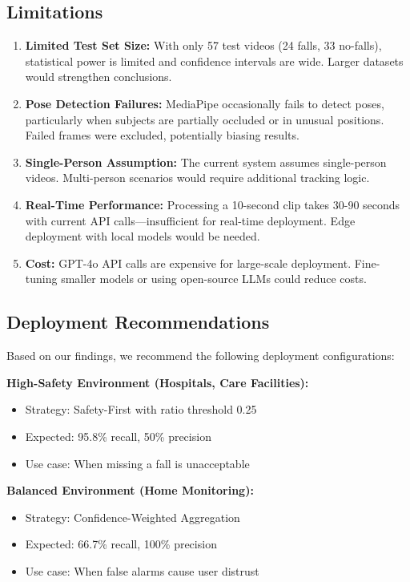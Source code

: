 \documentclass[conference]{IEEEtran}
\begin{document}
\subsection{Limitations}

\begin{enumerate}[leftmargin=*]
    \item \textbf{Limited Test Set Size:} With only 57 test videos (24 falls, 33 no-falls), statistical power is limited and confidence intervals are wide. Larger datasets would strengthen conclusions.
    
    \item \textbf{Pose Detection Failures:} MediaPipe occasionally fails to detect poses, particularly when subjects are partially occluded or in unusual positions. Failed frames were excluded, potentially biasing results.
    
    \item \textbf{Single-Person Assumption:} The current system assumes single-person videos. Multi-person scenarios would require additional tracking logic.
    
    \item \textbf{Real-Time Performance:} Processing a 10-second clip takes 30-90 seconds with current API calls—insufficient for real-time deployment. Edge deployment with local models would be needed.
    
    \item \textbf{Cost:} GPT-4o API calls are expensive for large-scale deployment. Fine-tuning smaller models or using open-source LLMs could reduce costs.
\end{enumerate}

\subsection{Deployment Recommendations}

Based on our findings, we recommend the following deployment configurations:

\textbf{High-Safety Environment (Hospitals, Care Facilities):}
\begin{itemize}[leftmargin=*]
    \item Strategy: Safety-First with ratio threshold 0.25
    \item Expected: 95.8\% recall, 50\% precision
    \item Use case: When missing a fall is unacceptable
\end{itemize}

\textbf{Balanced Environment (Home Monitoring):}
\begin{itemize}[leftmargin=*]
    \item Strategy: Confidence-Weighted Aggregation
    \item Expected: 66.7\% recall, 100\% precision
    \item Use case: When false alarms cause user distrust
\end{itemize}
\end{document}
